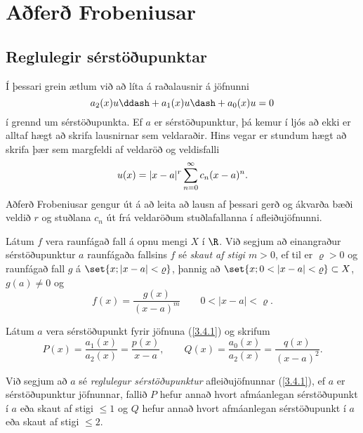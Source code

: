 



\section{Aðferð Frobeniusar}


\subsection*{Reglulegir sérstöðupunktar}

Í þessari grein ætlum við að líta á raðalausnir á jöfnunni
 \begin{equation*}a_2(x)u\ddash+a_1(x)u\dash+a_0(x) u=0
\label{3.4.1}
 \end{equation*}
í grennd um sérstöðupunkta.  Ef $a$ er sérstöðupunktur, þá kemur í
ljós að ekki er alltaf hægt að skrifa lausnirnar sem veldaraðir.
Hins vegar er stundum hægt að skrifa  þær sem margfeldi af veldaröð
og veldisfalli
 \begin{equation*}u(x)= |x-a|\sp r\sum_{n=0}\sp \infty c_n(x-a)\sp n.
\label{3.4.2}
 \end{equation*}
Aðferð Frobeniusar gengur út á að leita að lausn af þessari gerð og
ákvarða bæði veldið $r$ og stuðlana $c_n$ út frá veldaröðum
stuðlafallanna í afleiðujöfnunni.

\begin{sk}
Látum $f$ vera raunfágað fall á opnu mengi  $X$ í $\R$.
Við segjum að einangraður
sérstöðupunktur $a$ raunfágaða fallsins $f$ sé 
{\it skaut
 af
stigi $m>0$}, ef til er $\varrho>0$ og raunfágað fall $g$ á
$\set{x; |x-a|<\varrho}$, þannig að
$\set{x; 0<|x-a|<{\varrho}}\subset X$,  $g(a)\neq 0$ og
$$ f(x)=\dfrac {g(x)}{(x-a)^m}\qquad 0<|x-a|<\varrho. $$
\end{sk}


Látum $a$ vera sérstöðupunkt fyrir jöfnuna (\ref{3.4.1})
og skrifum 
 \begin{equation*}P(x)=\dfrac{a_1(x)}{a_2(x)}=\dfrac{p(x)}{x-a}, \qquad
Q(x)=\dfrac{a_0(x)}{a_2(x)}=\dfrac{q(x)}{(x-a)^2}.\label{3.4.3}
 \end{equation*}

\begin{sk}
Við segjum að $a$ sé {\it reglulegur sérstöðupunktur} 
afleiðujöfnunnar (\ref{3.4.1}), ef $a$ er sérstöðupunktur jöfnunnar,
fallið $P$ hefur annað hvort afmáanlegan sérstöðupunkt í $a$ eða skaut
af stigi $\leq 1$ og $Q$ hefur annað hvort afmáanlegan sérstöðupunkt
í $a$ eða skaut af stigi $\leq 2$. 
\end{sk}


